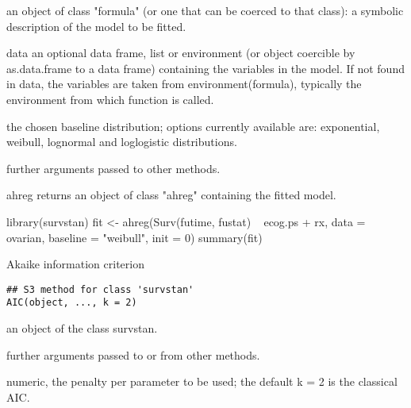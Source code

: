 \documentclass[letterpaper]{book}
\begin{document}
\begin{Arguments}
\begin{ldescription}
\item[\code{formula}] an object of class "formula" (or one that can be coerced to that class): a symbolic description of the model to be fitted.

\item[\code{data}] data an optional data frame, list or environment (or object coercible by as.data.frame to a data frame) containing the variables in the model. If not found in data, the variables are taken from environment(formula), typically the environment from which function is called.

\item[\code{baseline}] the chosen baseline distribution; options currently available are: exponential, weibull, lognormal and loglogistic distributions.

\item[\code{...}] further arguments passed to other methods.
\end{ldescription}
\end{Arguments}
%
\begin{Value}
ahreg returns an object of class "ahreg" containing the fitted model.
\end{Value}
%
\begin{Examples}
\begin{ExampleCode}

library(survstan)
fit <- ahreg(Surv(futime, fustat) ~ ecog.ps + rx, data = ovarian, baseline = "weibull", init = 0)
summary(fit)



\end{ExampleCode}
\end{Examples}
%
\begin{Description}\relax
Akaike information criterion
\end{Description}
%
\begin{Usage}
\begin{verbatim}
## S3 method for class 'survstan'
AIC(object, ..., k = 2)
\end{verbatim}
\end{Usage}
%
\begin{Arguments}
\begin{ldescription}
\item[\code{object}] an object of the class survstan.

\item[\code{...}] further arguments passed to or from other methods.

\item[\code{k}] numeric, the penalty per parameter to be used; the default k = 2 is the classical AIC.
\end{ldescription}
\end{Arguments}
\end{document}
